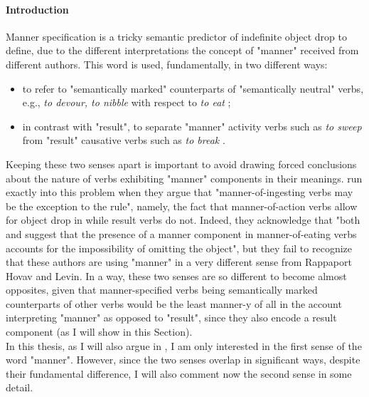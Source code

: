 \paragraph{Introduction}
Manner specification is a tricky semantic predictor of indefinite object drop to define, due to the different interpretations the concept of "manner" received from different authors. This word is used, fundamentally, in two different ways:
\begin{itemize}
    \item to refer to "semantically marked" counterparts of "semantically neutral" verbs, e.g., \textit{to devour, to nibble} with respect to \textit{to eat} \parencite{Naess2007, FellbaumKegl1989taxonomic, Rice1988};
    \item in contrast with "result", to separate "manner" activity verbs such as \textit{to sweep} from "result" causative verbs such as \textit{to break} \parencite{BeaversKoontzGarboden2012, BeaversKoontzGarboden2017, Beavers2013, RappaportLevin1998building, RappaportHovavLevin2005, LevinRappaportHovav2008, RappaportHovavLevin2010, Melchin2019}.
\end{itemize}

Keeping these two senses apart is important to avoid drawing forced conclusions about the nature of verbs exhibiting "manner" components in their meanings. \textcite[7]{Garcia-VelascoMunoz2002} run exactly into this problem when they argue that "manner-of-ingesting verbs may be the exception to the rule", namely, the fact that manner-of-action verbs allow for object drop in \textcite{RappaportLevin1998building} while result verbs do not. Indeed, they acknowledge that "both \textcite{Rice1988} and \textcite{FellbaumKegl1989taxonomic} suggest that the presence of a manner component in manner-of-eating verbs accounts for the impossibility of omitting the object", but they fail to recognize that these authors are using "manner" in a very different sense from Rappaport Hovav and Levin. In a way, these two senses are so different to become almost opposites, given that manner-specified verbs being semantically marked counterparts of other verbs would be the least manner-y of all in the account interpreting "manner" as opposed to "result", since they also encode a result component (as I will show in this Section).\\ %
In this thesis, as I will also argue in , I am only interested in the first sense of the word "manner". However, since the two senses overlap in significant ways, despite their fundamental difference, I will also comment now the second sense in some detail.

